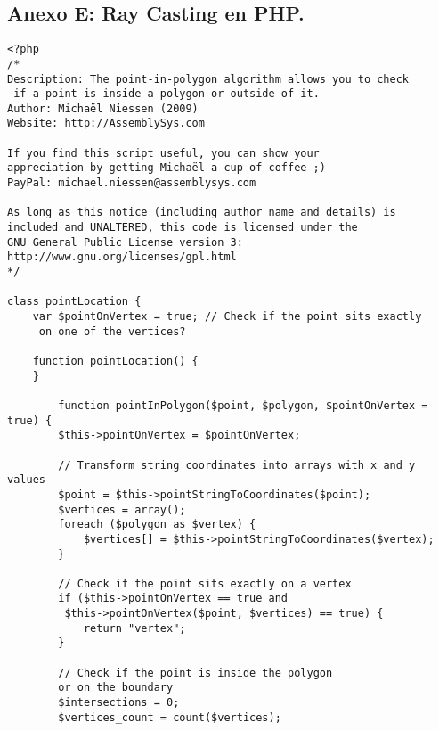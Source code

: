 \subsection*{Anexo E: Ray Casting en PHP.}
\label{anexo-c}

\hbox{}

\begin{verbatim}
<?php
/*
Description: The point-in-polygon algorithm allows you to check
 if a point is inside a polygon or outside of it.
Author: Michaël Niessen (2009)
Website: http://AssemblySys.com
 
If you find this script useful, you can show your
appreciation by getting Michaël a cup of coffee ;)
PayPal: michael.niessen@assemblysys.com
 
As long as this notice (including author name and details) is
included and UNALTERED, this code is licensed under the 
GNU General Public License version 3:
http://www.gnu.org/licenses/gpl.html
*/
 
class pointLocation {
    var $pointOnVertex = true; // Check if the point sits exactly
     on one of the vertices?
 
    function pointLocation() {
    }
 
        function pointInPolygon($point, $polygon, $pointOnVertex = true) {
        $this->pointOnVertex = $pointOnVertex;
 
        // Transform string coordinates into arrays with x and y values
        $point = $this->pointStringToCoordinates($point);
        $vertices = array(); 
        foreach ($polygon as $vertex) {
            $vertices[] = $this->pointStringToCoordinates($vertex); 
        }
 
        // Check if the point sits exactly on a vertex
        if ($this->pointOnVertex == true and
         $this->pointOnVertex($point, $vertices) == true) {
            return "vertex";
        }
 
        // Check if the point is inside the polygon 
        or on the boundary
        $intersections = 0; 
        $vertices_count = count($vertices);
 

\end{verbatim}
